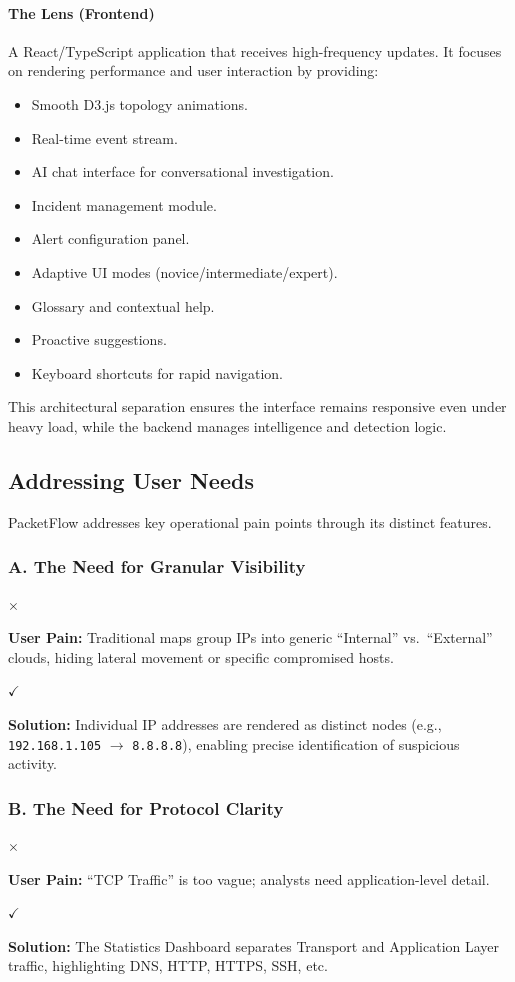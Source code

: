 \documentclass[
    11pt, 
    a4paper, 
    parskip=half, 
    headsepline,       %
    DIV=12             %
]{scrartcl}
\newcommand{\painpoint}[2]{
    \vspace{0.4em}
    \noindent
    \begin{minipage}[t]{0.05\linewidth}
        \color{pfRed}\small\bfseries $\times$
    \end{minipage}%
    \begin{minipage}[t]{0.95\linewidth}
        {\small\bfseries\color{pfRed} User Pain:} #1
    \end{minipage}\par
    \vspace{0.1em}
    \noindent
    \begin{minipage}[t]{0.05\linewidth}
        \color{pfCyan}\small\bfseries $\checkmark$
    \end{minipage}%
    \begin{minipage}[t]{0.95\linewidth}
        {\small\bfseries\color{pfCyan} Solution:} #2
    \end{minipage}
    \vspace{0.6em}
}
\begin{document}
\paragraph{The Lens (Frontend)}
A React/TypeScript application that receives high-frequency updates. It focuses on rendering performance and user interaction by providing:
\begin{itemize}
    \item Smooth D3.js topology animations.
    \item Real-time event stream.
    \item AI chat interface for conversational investigation.
    \item Incident management module.
    \item Alert configuration panel.
    \item Adaptive UI modes (novice/intermediate/expert).
    \item Glossary and contextual help.
    \item Proactive suggestions.
    \item Keyboard shortcuts for rapid navigation.
\end{itemize}

This architectural separation ensures the interface remains responsive even under heavy load, while the backend manages intelligence and detection logic.

\subsection{Addressing User Needs}
PacketFlow addresses key operational pain points through its distinct features.

\subsubsection*{A. The Need for Granular Visibility}
\painpoint{Traditional maps group IPs into generic ``Internal'' vs.\ ``External'' clouds, hiding lateral movement or specific compromised hosts.}
{Individual IP addresses are rendered as distinct nodes (e.g., \texttt{192.168.1.105} $\to$ \texttt{8.8.8.8}), enabling precise identification of suspicious activity.}

\subsubsection*{B. The Need for Protocol Clarity}
\painpoint{“TCP Traffic” is too vague; analysts need application-level detail.}
{The Statistics Dashboard separates Transport and Application Layer traffic, highlighting DNS, HTTP, HTTPS, SSH, etc.}
\end{document}
